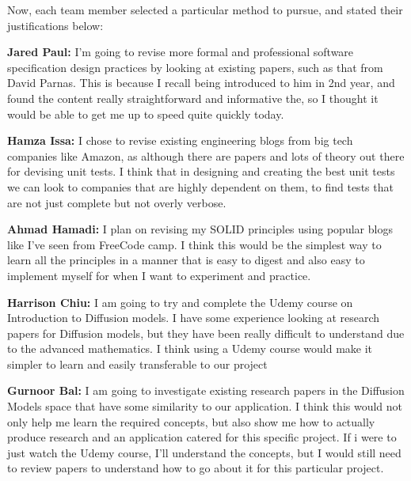 \documentclass[12pt, titlepage]{article}
\begin{document}
Now, each team member selected a particular method to pursue, and stated their justifications below:

\textbf{Jared Paul:} I'm going to revise more formal and professional software specification design practices by looking at existing papers, such as that from David Parnas. This is because I recall being introduced to him in 2nd year, and found the content really straightforward and informative the, so I thought it would be able to get me up to speed quite quickly today.

\textbf{Hamza Issa:} I chose to revise existing engineering blogs from big tech companies like Amazon, as although there are papers and lots of theory out there for devising unit tests. I think that in designing and creating the best unit tests we can look to companies that are highly dependent on them, to find tests that are not just complete but not overly verbose.

\textbf{Ahmad Hamadi:} I plan on revising my SOLID principles using popular blogs like I've seen from FreeCode camp. I think this would be the simplest way to learn all the principles in a manner that is easy to digest and also easy to implement myself for when I want to experiment and practice.

\textbf{Harrison Chiu:} I am going to try and complete the Udemy course on Introduction to Diffusion models. I have some experience looking at research papers for Diffusion models, but they have been really difficult to understand due to the advanced mathematics. I think using a Udemy course would make it simpler to learn and easily transferable to our project

\textbf{Gurnoor Bal:} I am going to investigate existing research papers in the Diffusion Models space that have some similarity to our application. I think this would not only help me learn the required concepts, but also show me how to actually produce research and an application catered for this specific project. If i were to just watch the Udemy course, I'll understand the concepts, but I would still need to review papers to understand how to go about it for this particular project.
\end{document}
